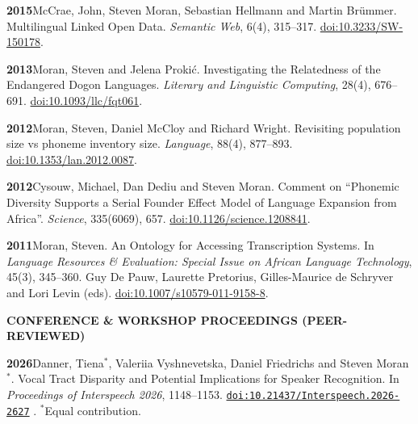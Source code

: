 \documentclass[11pt]{article}
\newcommand{\hangpara}{
 \setlength{\parindent}{0in} %
 \hangindent=0.42in %
}
\newcommand{\doi}[1]{%
  \href{https://doi.org/#1}{\nolinkurl{doi:#1}}%
}
\begin{document}
\hangpara
\vskip 6pt
{\bf 2015}\hspace{1ex}McCrae, John, Steven Moran, Sebastian Hellmann and Martin Brümmer. Multilingual Linked Open Data. \textit{Semantic Web}, 6(4), 315--317. \href{https://doi.org/10.3233/SW-150178}{doi:10.3233/SW-150178}. %

\vskip 6pt
\hangpara
{\bf 2013}\hspace{1ex}Moran, Steven and Jelena Proki{\'c}. Investigating the Relatedness of the Endangered Dogon Languages. \textit{Literary and Linguistic Computing}, 28(4), 676--691. \href{https://doi.org/10.1093/llc/fqt061}{doi:10.1093/llc/fqt061}. %

\vskip 6pt
\hangpara
{\bf 2012}\hspace{1ex}Moran, Steven, Daniel McCloy and Richard Wright. Revisiting population size vs phoneme inventory size. {\it Language}, 88(4), 877--893. \href{https://doi.org/10.1353/lan.2012.0087}{doi:10.1353/lan.2012.0087}. %

\vskip 6pt
\hangpara
{\bf 2012}\hspace{1ex}Cysouw, Michael, Dan Dediu and Steven Moran. Comment on ``Phonemic Diversity Supports a Serial Founder Effect Model of Language Expansion from Africa''. \textit{Science}, 335(6069), 657. \href{https://doi.org/10.1126/science.1208841}{doi:10.1126/science.1208841}.

\vskip 6pt
\hangpara
{\bf 2011}\hspace{1ex}Moran, Steven. An Ontology for Accessing Transcription Systems. In {\it Language Resources \& Evaluation: Special Issue on African Language Technology}, 45(3), 345--360. Guy De Pauw, Laurette Pretorius, Gilles-Maurice de Schryver and Lori Levin (eds). \href{https://doi.org/10.1007/s10579-011-9158-8}{doi:10.1007/s10579-011-9158-8}. %



\vskip 20pt
\begin{flushleft}
{\bf CONFERENCE \& WORKSHOP PROCEEDINGS (PEER-REVIEWED)}
\end{flushleft}

\hangpara
{\bf 2026}\hspace{1ex}Danner, Tiena$^*$, Valeriia Vyshnevetska, Daniel Friedrichs and Steven Moran$^*$. Vocal Tract Disparity and Potential Implications for Speaker Recognition. In {\it Proceedings of Interspeech 2026}, 1148--1153. \doi{10.21437/Interspeech.2026-2627}. $^*$Equal contribution.
\end{document}
